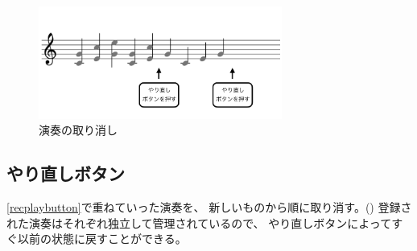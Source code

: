 \begin{figure}[tb]
\includegraphics[width=8cm,bb=0 0 1054 481]{images/rp4.png}
\centering
\caption{演奏の取り消し}
\label{recplay4}
\end{figure}

\subsection{やり直しボタン}

\ref{recplaybutton}で重ねていった演奏を、
新しいものから順に取り消す。()
登録された演奏はそれぞれ独立して管理されているので、
やり直しボタンによってすぐ以前の状態に戻すことができる。
